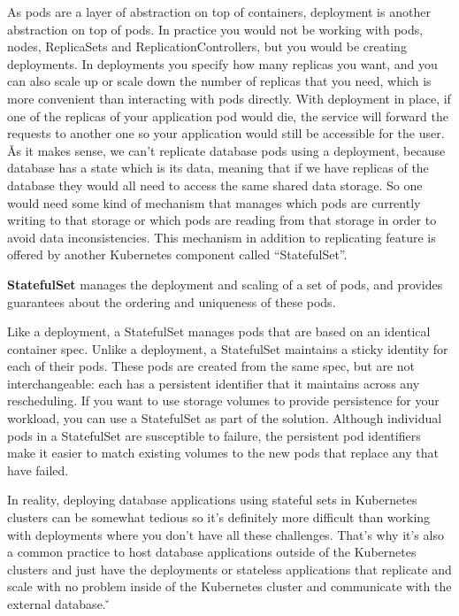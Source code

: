
As pods are a layer of abstraction on top of containers, deployment is another abstraction on top of pods. In
practice you would not be working with pods, nodes, ReplicaSets and ReplicationControllers, but you would be creating
deployments. In deployments you specify how many replicas you want, and you can also scale up or scale down the
number of replicas that you need, which is more convenient than interacting with pods directly. With deployment in
place, if one of the replicas of your application pod would die, the service will forward the requests to another one
so your application would still be accessible for the user. \v

As it makes sense, we can't replicate database pods using a deployment, because database has a state which is its
data, meaning that if we have replicas of the database they would all need to access the same shared data storage. So
one would need some kind of mechanism that manages which pods are currently writing to that storage or which pods are
reading from that storage in order to avoid data inconsistencies. This mechanism in addition to replicating feature
is offered by another Kubernetes component called ``StatefulSet''.

\bd[StatefulSet]
\textbf{StatefulSet} manages the deployment and scaling of a set of pods, and provides guarantees about the ordering and
uniqueness of these pods.
\ed

Like a deployment, a StatefulSet manages pods that are based on an identical container spec. Unlike a deployment, a
StatefulSet maintains a sticky identity for each of their pods. These pods are created from the same spec, but are
not interchangeable: each has a persistent identifier that it maintains across any rescheduling. If you want to use
storage volumes to provide persistence for your workload, you can use a StatefulSet as part of the solution. Although
individual pods in a StatefulSet are susceptible to failure, the persistent pod identifiers make it easier to match
existing volumes to the new pods that replace any that have failed.


In reality, deploying database applications using stateful sets in Kubernetes clusters can be somewhat tedious so
it's definitely more difficult than working with deployments where you don't have all these challenges. That's why
it's also a common practice to host database applications outside of the Kubernetes clusters and just have the
deployments or stateless applications that replicate and scale with no problem inside of the Kubernetes cluster and
communicate with the external database. \v


